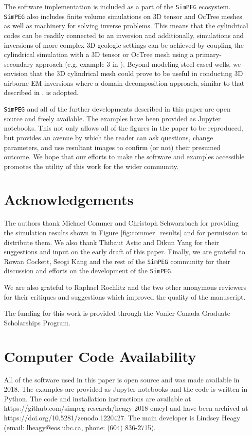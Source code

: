 \documentclass[preprint,review,3p,times,onecolumn,authoryear]{elsarticle}
\begin{document}
The software implementation is included as a part of the \texttt{SimPEG} ecosystem. \texttt{SimPEG} also includes finite volume simulations on 3D tensor and OcTree meshes as well as machinery for solving inverse problems. This means that the cylindrical codes can be readily connected to an inversion and additionally, simulations and inversions of more complex 3D geologic settings can be achieved by coupling the cylindrical simulation with a 3D tensor or OcTree mesh using a primary-secondary approach (e.g. example 3 in \cite{Heagy2017}). Beyond modeling steel cased wells, we envision that the 3D cylindrical mesh could prove to be useful in conducting 3D airborne EM inversions where a domain-decomposition approach, similar to that described in \cite{Yang2014}, is adopted.

\texttt{SimPEG} and all of the further developments described in this paper are open source and freely available. The examples have been provided as Jupyter notebooks. This not only allows all of the figures in the paper to be reproduced, but provides an avenue by which the reader can ask questions, change parameters, and use resultant images to confirm (or not) their presumed outcome. We hope that our efforts to make the software and examples accessible promotes the utility of this work for the wider community.

\section{Acknowledgements}
The authors thank Michael Commer and Christoph Schwarzbach for providing the simulation results shown in Figure \ref{fig:commer_results} and for permission to distribute them.
We also thank Thibaut Astic and Dikun Yang for their suggestions and input on the early draft of this paper. Finally, we are grateful to Rowan Cockett, Seogi Kang and the rest of the \texttt{SimPEG} community for their discussion and efforts on the development of the \texttt{SimPEG}.

We are also grateful to Raphael Rochlitz and the two other anonymous reviewers for their critiques and suggestions which improved the quality of the manuscript.

The funding for this work is provided through the Vanier Canada Graduate Scholarships Program.

\section{Computer Code Availability}
All of the software used in this paper is open source and was made available in 2018. The examples are provided as Jupyter notebooks and the code is written in Python. The code and installation instructions are available at https://github.com/simpeg-research/heagy-2018-emcyl and have been archived at https://doi.org/10.5281/zenodo.1220427. The main developer is Lindsey Heagy (email: lheagy@eos.ubc.ca, phone: (604) 836-2715).
\end{document}
